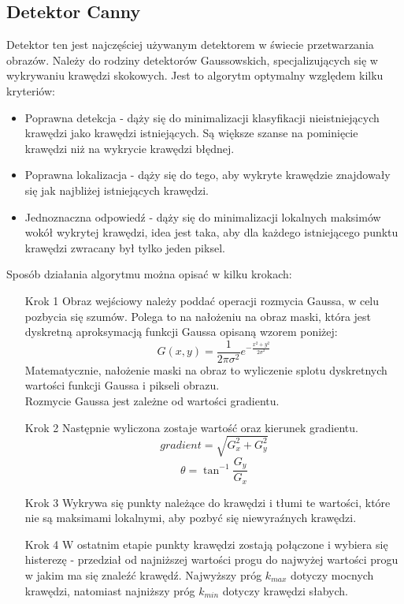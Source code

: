 \documentclass[eng,oneside]{mgr}
\begin{document}
\subsection{Detektor Canny}
Detektor ten jest najczęściej używanym detektorem w świecie przetwarzania obrazów. Należy do rodziny detektorów Gaussowskich, specjalizujących się w wykrywaniu krawędzi skokowych. Jest to algorytm optymalny względem kilku kryteriów:
\begin{itemize}
\item Poprawna detekcja - dąży się do minimalizacji klasyfikacji nieistniejących krawędzi jako krawędzi istniejących. Są większe szanse na pominięcie krawędzi niż na wykrycie krawędzi błędnej.
\item Poprawna lokalizacja - dąży się do tego, aby wykryte krawędzie znajdowały się jak najbliżej istniejących krawędzi.
\item Jednoznaczna odpowiedź - dąży się do minimalizacji lokalnych maksimów wokół wykrytej krawędzi, idea jest taka, aby dla każdego istniejącego punktu krawędzi zwracany był tylko jeden piksel.
\end{itemize}
Sposób działania algorytmu można opisać w kilku krokach:
\begin{itemize}
\item [Krok 1] Obraz wejściowy należy poddać operacji rozmycia Gaussa, w celu pozbycia się szumów. Polega to na nałożeniu na obraz maski, która jest dyskretną aproksymacją funkcji Gaussa opisaną wzorem poniżej:
\begin{equation}
G(x,y) = \frac{1}{2\pi\sigma^2}e^{-\frac{x^2+y^2}{2\sigma^2}}
\end{equation}
Matematycznie, nałożenie maski na obraz to wyliczenie splotu dyskretnych wartości funkcji Gaussa i pikseli obrazu\cite{gauss}.\\
Rozmycie Gaussa jest zależne od wartości gradientu.
\item [Krok 2] Następnie wyliczona zostaje wartość oraz kierunek gradientu. 
\begin{equation}
gradient = \sqrt{G_x^2 + G_y^2} 
\end{equation}
\begin{equation}
\theta = \tan ^{-1} \frac{G_y}{G_x}
\end{equation}
\item [Krok 3] Wykrywa się punkty należące do krawędzi i tłumi te wartości, które nie są maksimami lokalnymi, aby pozbyć się niewyraźnych krawędzi.
\item [Krok 4]  W ostatnim etapie punkty krawędzi zostają połączone i wybiera się histerezę - przedział od najniższej wartości progu do najwyżej wartości progu w jakim ma się znaleźć krawędź. Najwyższy próg $k_{max}$ dotyczy mocnych krawędzi, natomiast najniższy próg $k_{min}$ dotyczy krawędzi słabych.
\end{itemize}
\end{document}
